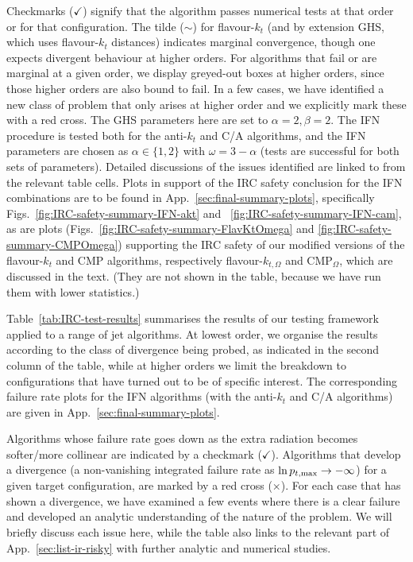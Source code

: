 \documentclass[nofootinbib,twocolumn,preprintnumbers,superscriptaddress,aps]{revtex4-2}
\newcommand{\ok}{$\checkmark$}
\newcommand{\no}{\color{red}$\times$}
\begin{document}
\begin{table*}[t]
{    %
    Checkmarks (\ok) signify that the algorithm passes numerical tests at that order or for that configuration.
    The tilde ($\sim$) for flavour-$k_t$ (and by extension GHS, which uses flavour-$k_t$
    distances) indicates marginal convergence, though one expects 
    divergent behaviour at higher orders.
    For algorithms that fail or are marginal at a given order, we display greyed-out
    boxes at higher orders, since those higher orders are also bound to
    fail.
    In a few cases, we have identified a new class of problem that
    only arises at higher order and we explicitly mark these with a red cross.
    The GHS parameters here are set to $\alpha=2,\beta=2$.
    The IFN procedure is tested both for the anti-$k_t$ and C/A
    algorithms, and the IFN parameters are chosen as $\alpha \in
    \{1,2\}$ with $\omega=3-\alpha$ 
    (tests are successful for both sets of parameters).
    Detailed discussions of the issues identified are linked to from
    the relevant table cells.
    Plots in support of the IRC safety conclusion for the IFN
    combinations are to be found in
    App.~\ref{sec:final-summary-plots}, specifically
    Figs.~\ref{fig:IRC-safety-summary-IFN-akt} and
    ~\ref{fig:IRC-safety-summary-IFN-cam}, as are plots
    (Figs.~\ref{fig:IRC-safety-summary-FlavKtOmega} and
    \ref{fig:IRC-safety-summary-CMPOmega}) supporting the IRC safety
    of our modified versions of the flavour-$k_t$ and CMP algorithms,
    respectively flavour-$k_{t,\Omega}$ and CMP$_\Omega$, which are
    discussed in the text. (They are not shown in the table, because
    we have run them with lower statistics.)}
  \label{tab:IRC-test-results}
\end{table*}



Table~\ref{tab:IRC-test-results} summarises the results of our testing framework applied to a range of jet algorithms.
%
At lowest order, we organise the results according to the class of
divergence being probed, as indicated in the second column of the
table, while at higher orders we limit the breakdown to configurations
that have turned out to be of specific interest.
%
The corresponding failure rate plots for the IFN algorithms (with the anti-$k_t$ and
C/A algorithms) are given in App.~\ref{sec:final-summary-plots}.


Algorithms whose failure rate goes down as the extra radiation becomes
softer/more collinear are indicated by a checkmark (\ok).
%
Algorithms that develop a divergence (a non-vanishing integrated
failure rate as $\ln p_{t,\rm{max}} \to -\infty$) for a given target
configuration, are marked by a red cross ({\no}).
%
For each case that has shown a divergence, we have examined a few
events where there is a clear failure and developed an analytic
understanding of the nature of the problem.
%
We will briefly discuss each issue here, while the table also
links to the relevant part of App.~\ref{sec:list-ir-risky} with
further analytic and numerical studies.
\end{document}
